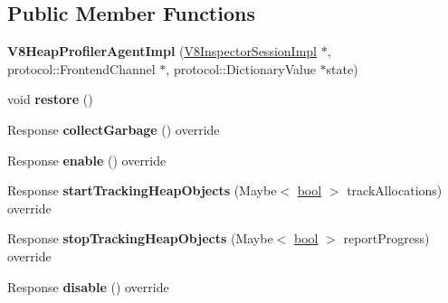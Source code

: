 \subsection*{Public Member Functions}
\begin{DoxyCompactItemize}
\item 
\mbox{\label{classv8__inspector_1_1V8HeapProfilerAgentImpl_aac42cd3d8c6a5b7af951c100a0e76938}} 
{\bfseries V8\+Heap\+Profiler\+Agent\+Impl} (\mbox{\hyperlink{classv8__inspector_1_1V8InspectorSessionImpl}{V8\+Inspector\+Session\+Impl}} $\ast$, protocol\+::\+Frontend\+Channel $\ast$, protocol\+::\+Dictionary\+Value $\ast$state)
\item 
\mbox{\label{classv8__inspector_1_1V8HeapProfilerAgentImpl_acd028e018255aca3916afddc9c989dc7}} 
void {\bfseries restore} ()
\item 
\mbox{\label{classv8__inspector_1_1V8HeapProfilerAgentImpl_ac70e52dcf96a8a468e730a256b21bc65}} 
Response {\bfseries collect\+Garbage} () override
\item 
\mbox{\label{classv8__inspector_1_1V8HeapProfilerAgentImpl_a01c0599210861a9a7227f2ac50458d7f}} 
Response {\bfseries enable} () override
\item 
\mbox{\label{classv8__inspector_1_1V8HeapProfilerAgentImpl_ac7fc6de2441d01a2876a631faab3f690}} 
Response {\bfseries start\+Tracking\+Heap\+Objects} (Maybe$<$ \mbox{\hyperlink{classbool}{bool}} $>$ track\+Allocations) override
\item 
\mbox{\label{classv8__inspector_1_1V8HeapProfilerAgentImpl_a584023e42c0a77e73b8f854823a28f2f}} 
Response {\bfseries stop\+Tracking\+Heap\+Objects} (Maybe$<$ \mbox{\hyperlink{classbool}{bool}} $>$ report\+Progress) override
\item 
\mbox{\label{classv8__inspector_1_1V8HeapProfilerAgentImpl_a2bd08340b7c4ba22256effb08a860f23}} 
Response {\bfseries disable} () override
\item 

\end{DoxyCompactItemize}
